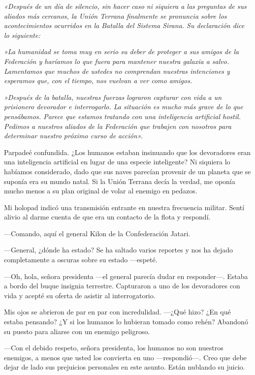 \textit{«Después de un día de silencio, sin hacer caso ni siquiera a las preguntas de sus aliados más cercanos, la Unión Terrana finalmente se pronuncia sobre los acontecimientos ocurridos en la Batalla del Sistema Sirana. Su declaración dice lo siguiente:}

\textit{»La humanidad se toma muy en serio su deber de proteger a sus amigos de la Federación y haríamos lo que fuera para mantener nuestra galaxia a salvo. Lamentamos que muchos de ustedes no comprendan nuestras intenciones y esperamos que, con el tiempo, nos vuelvan a ver como amigos.}

\textit{»Después de la batalla, nuestras fuerzas lograron capturar con vida a un prisionero devorador e interrogarlo. La situación es mucho más grave de lo que pensábamos. Parece que estamos tratando con una inteligencia artificial hostil. Pedimos a nuestros aliados de la Federación que trabajen con nosotros para determinar nuestro próximo curso de acción».}

Parpadeé confundida. ¿Los humanos estaban insinuando que los devoradores eran una inteligencia artificial en lugar de una especie inteligente? Ni siquiera lo habíamos considerado, dado que sus naves parecían provenir de un planeta que se suponía era su mundo natal. Si la Unión Terrana decía la verdad, me oponía mucho menos a su plan original de volar al enemigo en pedazos.

Mi holopad indicó una transmisión entrante en nuestra frecuencia militar. Sentí alivio al darme cuenta de que era un contacto de la flota y respondí.

—Comando, aquí el general Kilon de la Confederación Jatari.

—General, ¿dónde ha estado? Se ha saltado varios reportes y nos ha dejado completamente a oscuras sobre su estado —espeté.

—Oh, hola, señora presidenta —el general parecía dudar en responder—. Estaba a bordo del buque insignia terrestre. Capturaron a uno de los devoradores con vida y acepté su oferta de asistir al interrogatorio.

Mis ojos se abrieron de par en par con incredulidad. —¿Qué hizo? ¿En qué estaba pensando? ¿Y si los humanos lo hubieran tomado como rehén? Abandonó su puesto para aliarse con un enemigo peligroso.

—Con el debido respeto, señora presidenta, los humanos no son nuestros enemigos, a menos que usted los convierta en uno —respondió—. Creo que debe dejar de lado sus prejuicios personales en este asunto. Están nublando su juicio.


